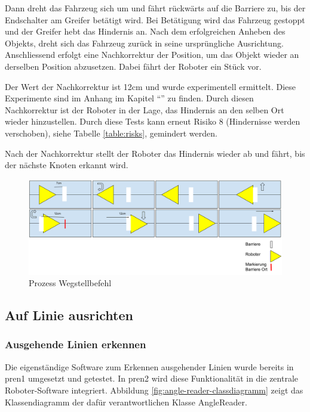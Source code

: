 Dann dreht das Fahrzeug sich um und fährt rückwärts auf die Barriere zu, bis der Endschalter am Greifer betätigt wird. Bei Betätigung wird das Fahrzeug gestoppt und der Greifer hebt das Hindernis an.
Nach dem erfolgreichen Anheben des Objekts, dreht sich das Fahrzeug zurück in seine ursprüngliche Ausrichtung. Anschliessend erfolgt eine Nachkorrektur der Position, um das Objekt wieder an derselben Position abzusetzen. Dabei fährt der Roboter ein Stück vor.

Der Wert der Nachkorrektur ist 12cm und wurde experimentell ermittelt. Diese Experimente sind im Anhang im Kapitel ``'' zu finden. Durch diesen Nachkorrektur ist der Roboter in der Lage, das Hindernis an den selben Ort wieder hinzustellen. Durch diese Tests kann erneut Risiko 8 (Hindernisse werden verschoben), siehe Tabelle \ref{table:risks}, gemindert werden.

Nach der Nachkorrektur stellt der Roboter das Hindernis wieder ab und fährt, bis der nächste Knoten erkannt wird.

\begin{figure}[H]
    \centering
    \includegraphics[width=\linewidth]{assets/ET/wegstellbefehl.png}
    \caption{Prozess Wegstellbefehl}
    \label{fig:wegstellbefehl}
\end{figure}


\newpage
\subsection{Auf Linie ausrichten}


\subsubsection{Ausgehende Linien erkennen}
\label{outgoing-lines}

Die eigenständige Software zum Erkennen ausgehender Linien wurde bereits in \acrshort{pren1} umgesetzt und getestet. In \acrshort{pren2} wird diese Funktionalität in die zentrale Roboter-Software integriert. Abbildung \ref{fig:angle-reader-classdiagramm} zeigt das Klassendiagramm der dafür verantwortlichen Klasse AngleReader.

